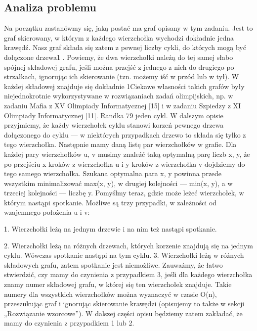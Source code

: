 \documentclass[12pt,a4paper]{article}
\begin{document}
        \subsection{Analiza problemu}
            Na początku zastanówmy się, jaką postać ma graf opisany w tym zadaniu. Jest to
graf skierowany, w którym z każdego wierzchołka wychodzi dokładnie jedna krawędź.
Nasz graf składa się zatem z pewnej liczby cykli, do których mogą być dołączone
drzewa1
.
Powiemy, że dwa wierzchołki należą do tej samej słabo spójnej składowej grafu, jeśli
można przejść z jednego z nich do drugiego po strzałkach, ignorując ich skierowanie
(tzn. możemy iść w przód lub w tył). W każdej składowej znajduje się dokładnie
1Ciekawe własności takich grafów były niejednokrotnie wykorzystywane w rozwiązaniach zadań olimpijskich, np. w zadaniu Mafia z XV Olimpiady Informatycznej [15] i w zadaniu Szpiedzy
z XI Olimpiady Informatycznej [11].
Randka 79
jeden cykl. W dalszym opisie przyjmiemy, że każdy wierzchołek cyklu stanowi korzeń
pewnego drzewa dołączonego do cyklu — w niektórych przypadkach drzewo to składa
się tylko z tego wierzchołka.
Następnie mamy daną listę par wierzchołków w grafie. Dla każdej pary wierzchołków u, v musimy znaleźć taką optymalną parę liczb x, y, że po przejściu x kroków
z wierzchołka u i y kroków z wierzchołka v dojdziemy do tego samego wierzchołka.
Szukana optymalna para x, y powinna przede wszystkim minimalizować max(x, y),
w drugiej kolejności — min(x, y), a w trzeciej kolejności — liczbę y.
Pomyślmy teraz, gdzie może leżeć wierzchołek, w którym nastąpi spotkanie. Możliwe są trzy przypadki, w zależności od wzajemnego położenia u i v:



1. Wierzchołki leżą na jednym drzewie i na nim też nastąpi spotkanie.



2. Wierzchołki leżą na różnych drzewach, których korzenie znajdują się na jednym
cyklu.
Wówczas spotkanie nastąpi na tym cyklu.
3. Wierzchołki leżą w różnych składowych grafu, zatem spotkanie jest niemożliwe.
Zauważmy, że łatwo stwierdzić, czy mamy do czynienia z przypadkiem 3, jeśli
dla każdego wierzchołka znamy numer składowej grafu, w której się ten wierzchołek znajduje. Takie numery dla wszystkich wierzchołków można wyznaczyć w czasie
O(n), przeszukując graf i ignorując skierowanie krawędzi (opisujemy to także w sekcji
„Rozwiązanie wzorcowe”). W dalszej części opisu będziemy zatem zakładać, że mamy
do czynienia z przypadkiem 1 lub 2.
\end{document}
